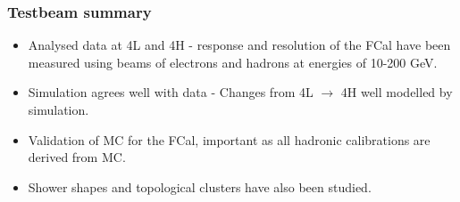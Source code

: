 \documentclass[10pt]{beamer}
\begin{document}
\begin{frame}\frametitle{Testbeam summary}
\begin{itemize}
\item Analysed data at 4L and 4H - response and resolution of the FCal have been measured using beams of electrons and hadrons at energies of 10-200 GeV.
\item Simulation agrees well with data - Changes from 4L $\rightarrow$ 4H well modelled by simulation.
\item Validation of MC for the FCal, important as all \atlas hadronic calibrations are derived from MC.
\item Shower shapes and topological clusters have also been studied.
\end{itemize}
\end{frame}
\end{document}
